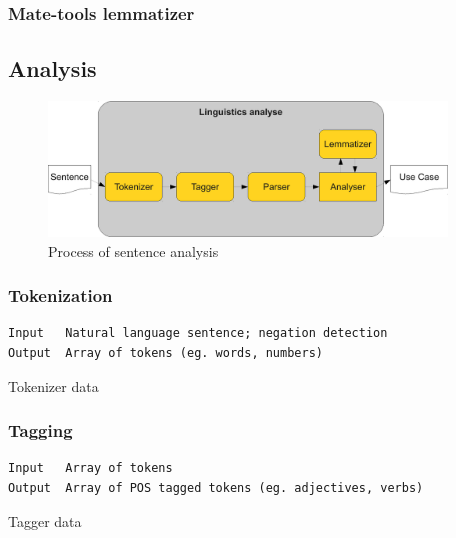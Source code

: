 \subsubsection{Mate-tools lemmatizer}          
          
\subsection{Analysis}
\label{sec:analysis}

\begin{figure}[ht]
  \centering
  \includegraphics[width=300pt]{images/LinguisticsAnalyse}
  \caption{Process of sentence analysis}
  \label{fig:LinguisticsAnalyse}
\end{figure}

\subsubsection{Tokenization}
\begin{table}[ht]   %
\begin{center}
    \begin{verbatim}
Input 	Natural language sentence; negation detection
Output 	Array of tokens (eg. words, numbers) 
        \end{verbatim}
  \caption{Tokenizer data}
  \label{tab.tokenization}
\end{center}
\end{table} 

\subsubsection{Tagging}
\begin{table}[ht]   %
\begin{center}
    \begin{verbatim}
Input 	Array of tokens
Output 	Array of POS tagged tokens (eg. adjectives, verbs) 
        \end{verbatim}
  \caption{Tagger data}
  \label{tab.tagging}
\end{center}
\end{table} 

